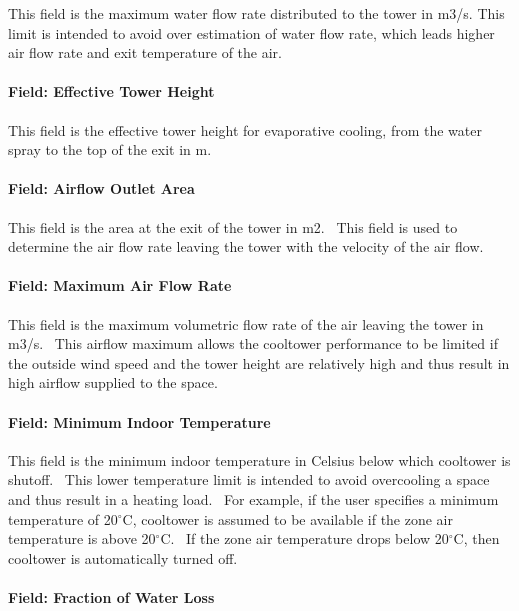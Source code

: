 This field is the maximum water flow rate distributed to the tower in m3/s. This limit is intended to avoid over estimation of water flow rate, which leads higher air flow rate and exit temperature of the air.

\paragraph{Field: Effective Tower Height}\label{field-effective-tower-height}

This field is the effective tower height for evaporative cooling, from the water spray to the top of the exit in m.

\paragraph{Field: Airflow Outlet Area}\label{field-airflow-outlet-area}

This field is the area at the exit of the tower in m2. ~This field is used to determine the air flow rate leaving the tower with the velocity of the air flow.

\paragraph{Field: Maximum Air Flow Rate}\label{field-maximum-air-flow-rate-000}

This field is the maximum volumetric flow rate of the air leaving the tower in m3/s. ~This airflow maximum allows the cooltower performance to be limited if the outside wind speed and the tower height are relatively high and thus result in high airflow supplied to the space.

\paragraph{Field: Minimum Indoor Temperature}\label{field-minimum-indoor-temperature-2}

This field is the minimum indoor temperature in Celsius below which cooltower is shutoff. ~This lower temperature limit is intended to avoid overcooling a space and thus result in a heating load. ~For example, if the user specifies a minimum temperature of 20$^\circ$C, cooltower is assumed to be available if the zone air temperature is above 20$^\circ$C. ~If the zone air temperature drops below 20$^\circ$C, then cooltower is automatically turned off.

\paragraph{Field: Fraction of Water Loss}\label{field-fraction-of-water-loss}

